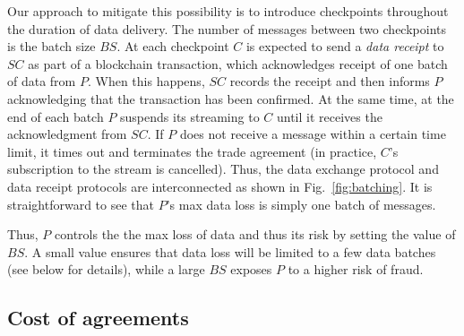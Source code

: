 \documentclass[letterpaper, 10 pt, conference]{ieeeconf}  %
\newcommand{\bs}{\ensuremath{\mathit{BS}}}
\newcommand{\ti}{\ensuremath{\mathit{TI}}}
\newcommand{\smartc}{\ensuremath{\mathit{SC}}}
\newcommand{\rtEst}{\ensuremath{\widehat{\mathit{RT}}}}
\begin{document}
Our approach to mitigate this possibility is to introduce checkpoints throughout the duration of data delivery. 
The number of messages between two checkpoints is the batch size \bs. 
At each checkpoint $C$ is expected to send a \textit{data receipt} to \smartc{} as part of a blockchain transaction, which acknowledges receipt of one batch of data from $P$.
When this happens, \smartc{} records the receipt and then informs $P$ acknowledging that the transaction has been confirmed.
At the same time, at the end of each batch $P$ suspends its streaming to $C$ until it receives the acknowledgment from \smartc.
If $P$ does not receive a message within a certain time limit, it times out and terminates the trade agreement (in practice, $C$'s subscription to the stream is cancelled).
Thus, the data exchange protocol and data receipt protocols are interconnected as shown in Fig.~\ref{fig:batching}.
It is straightforward to see that $P$'s max data loss is simply one batch  of messages.

Thus,  $P$ controls the the max loss of data and thus its risk by setting the value of \bs.
A small value ensures that data loss will be limited to a few data batches (see below for details), while a large \bs{} exposes $P$ to a higher risk of fraud.


\subsection{Cost of agreements}  \label{sec:cost}
\end{document}
